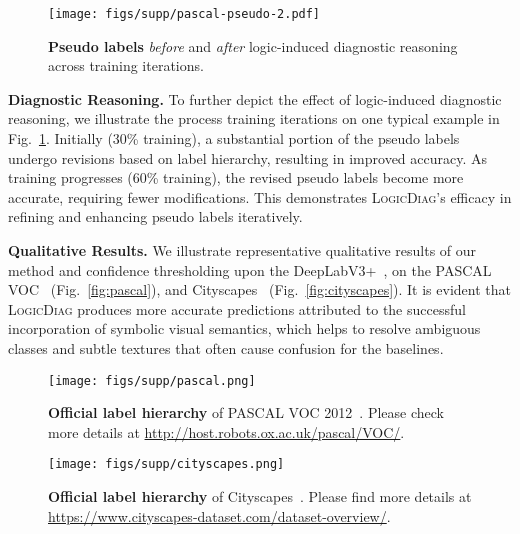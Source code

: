 \documentclass[10pt,twocolumn,letterpaper]{article}
\def\Ours{{\textsc{LogicDiag}}}
\begin{document}
\begin{figure}[t]
  \begin{center}
      \texttt{[image: figs/supp/pascal-pseudo-2.pdf]}
  \end{center}
  \vspace{-10pt}
  \captionsetup{font=small}
  \caption{\small \textbf{Pseudo labels} \textit{before} and \textit{after} logic-induced diagnostic reasoning across training iterations.}
  \label{fig:int}
\end{figure}

\noindent\textbf{Diagnostic Reasoning.}
To further depict the effect of logic-induced diagnostic reasoning, we illustrate the process \wrt training iterations on one typical example in Fig.~\ref{fig:int}. 
Initially (30\% training), a substantial portion of the pseudo labels undergo revisions based on label hierarchy, resulting in improved accuracy. As training progresses (60\% training), the revised pseudo labels become more accurate, requiring fewer modifications. This demonstrates {\Ours}'s efficacy in refining and enhancing pseudo labels iteratively. 


\noindent\textbf{Qualitative Results.} We illustrate representative qualitative results of our method and confidence thresholding upon the DeepLabV3+~\cite{chen2018encoder}, on the PASCAL VOC~\cite{everingham2015pascal} (Fig.~\ref{fig:pascal}), and Cityscapes~\cite{cordts2016cityscapes} (Fig.~\ref{fig:cityscapes}). 
It is evident that {\Ours} produces more accurate predictions attributed to the successful incorporation of symbolic visual semantics, which helps to resolve ambiguous classes and subtle textures that often cause confusion for the baselines.


\begin{figure}[t]
  \begin{center}
      \texttt{[image: figs/supp/pascal.png]}
  \end{center}
  \vspace{7.2ex}
  \captionsetup{font=small}
  \caption{\small \textbf{Official label hierarchy} of PASCAL VOC 2012~\cite{everingham2015pascal}. Please check more details at \url{http://host.robots.ox.ac.uk/pascal/VOC/}.}
  \label{fig:hier:pascal}
\end{figure} 

\begin{figure}[t]
  \begin{center}
      \texttt{[image: figs/supp/cityscapes.png]}
  \end{center}
  \captionsetup{font=small}
  \caption{\small \textbf{Official label hierarchy} of Cityscapes~\cite{cordts2016cityscapes}. Please find more details at \url{https://www.cityscapes-dataset.com/dataset-overview/}.}
  \label{fig:hier:cityscapes}
\end{figure} 
\end{document}
